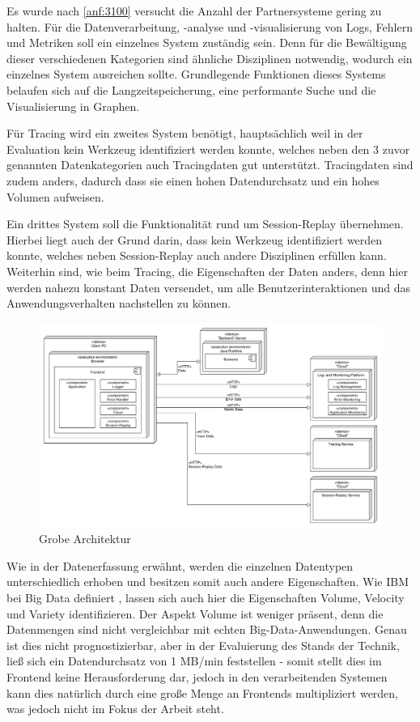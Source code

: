	Es wurde nach \autoref{anf:3100} versucht die Anzahl der Partnersysteme gering zu halten. Für die Datenverarbeitung, -analyse und -visualisierung von Logs, Fehlern und Metriken soll ein einzelnes System zuständig sein. Denn für die Bewältigung dieser verschiedenen Kategorien sind ähnliche Disziplinen notwendig, wodurch ein einzelnes System ausreichen sollte. Grundlegende Funktionen dieses Systems belaufen sich auf die Langzeitspeicherung, eine performante Suche und die Visualisierung in Graphen.
	
	Für Tracing wird ein zweites System benötigt, hauptsächlich weil in der Evaluation kein Werkzeug identifiziert werden konnte, welches neben den 3 zuvor genannten Datenkategorien auch Tracingdaten gut unterstützt. Tracingdaten sind zudem anders, dadurch dass sie einen hohen Datendurchsatz und ein hohes Volumen aufweisen.
	
	Ein drittes System soll die Funktionalität rund um Session-Replay übernehmen. Hierbei liegt auch der Grund darin, dass kein Werkzeug identifiziert werden konnte, welches neben Session-Replay auch andere Disziplinen erfüllen kann. Weiterhin sind, wie beim Tracing, die Eigenschaften der Daten anders, denn hier werden nahezu konstant Daten versendet, um alle Benutzerinteraktionen und das Anwendungsverhalten nachstellen zu können.
	
\begin{figure}[H]
	\centering
	\includegraphics[width=0.65\linewidth]{img/04_erstellung-poc/konzept-simple.png}
	\caption{Grobe Architektur}
	\label{fig:grobe-architektur}
\end{figure}

Wie in der Datenerfassung erwähnt, werden die einzelnen Datentypen unterschiedlich erhoben und besitzen somit auch andere Eigenschaften. Wie IBM bei Big Data definiert \cite{ZikopoulosUnderstandingBigData}, lassen sich auch hier die Eigenschaften Volume, Velocity und Variety identifizieren. Der Aspekt Volume ist weniger präsent, denn die Datenmengen sind nicht vergleichbar mit echten Big-Data-Anwendungen. Genau ist dies nicht prognostizierbar, aber in der Evaluierung des Stands der Technik, ließ sich ein Datendurchsatz von 1 MB/min feststellen - somit stellt dies im Frontend keine Herausforderung dar, jedoch in den verarbeitenden Systemen kann dies natürlich durch eine große Menge an Frontends multipliziert werden, was jedoch nicht im Fokus der Arbeit steht.

